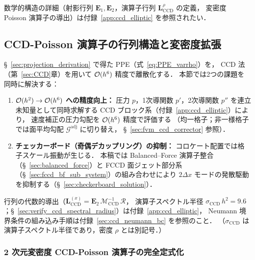 数学的構造の詳細（射影行列 $\mathbf{E}_1, \mathbf{E}_2$，演算子行列 $\mathbf{L}_{\mathrm{CCD}}^{\rho}$ の定義，
変密度 Poisson 演算子の導出）は付録~\ref{app:ccd_elliptic} を参照されたい．

\subsection{CCD-Poisson 演算子の行列構造と変密度拡張}
\label{sec:ccd_poisson_matrix}

§~\ref{sec:projection_derivation} で得た PPE（式~\eqref{eq:PPE_varrho}）を，
CCD 法（第~\ref{sec:CCD}章）を用いて $\mathcal{O}(h^6)$ 精度で離散化する．
本節では2つの課題を同時に解決する：

\begin{enumerate}
  \item \textbf{$\mathcal{O}(h^2) \to \mathcal{O}(h^6)$ への精度向上：}
        圧力 $p$，1次導関数 $p'$，2次導関数 $p''$ を連立未知量として同時求解する
        CCD ブロック系（付録~\ref{app:ccd_elliptic}）により，
        速度補正の圧力勾配を $\mathcal{O}(h^6)$ 精度で評価する
        （均一格子；非一様格子では面平均勾配 $\mathcal{G}^\text{adj}$ に切り替え，
        §~\ref{sec:fvm_ccd_corrector} 参照）．
  \item \textbf{チェッカーボード（奇偶デカップリング）の抑制：}
        コロケート配置では格子スケール振動が生じる．
        本稿では Balanced--Force 演算子整合（§~\ref{sec:balanced_force}）と
        FCCD 面ジェット部分系（§~\ref{sec:fccd_bf_sub_system}）の組み合わせにより
        $2\Delta x$ モードの発散駆動を抑制する（§~\ref{sec:checkerboard_solution}）．
\end{enumerate}

行列の代数的導出（$\mathbf{L}_{\mathrm{CCD}}^{(x)} = \mathbf{E}_2\,\mathcal{M}_{\mathrm{CCD}}^{-1}\,\mathcal{R}$，
演算子スペクトル半径 $\sigma_\mathrm{CCD}\,h^2 = 9.6$；§~\ref{sec:verify_ccd_spectral_radius}）は付録~\ref{app:ccd_elliptic}，
Neumann 境界条件の組み込み手順は付録~\ref{sec:ccd_neumann_bc} を参照のこと．
（$\sigma_\mathrm{CCD}$ は演算子スペクトル半径であり，密度 $\rho$ とは別記号．）

\subsubsection{2 次元変密度 CCD-Poisson 演算子の完全定式化}
\label{sec:ccd_2d_full}

